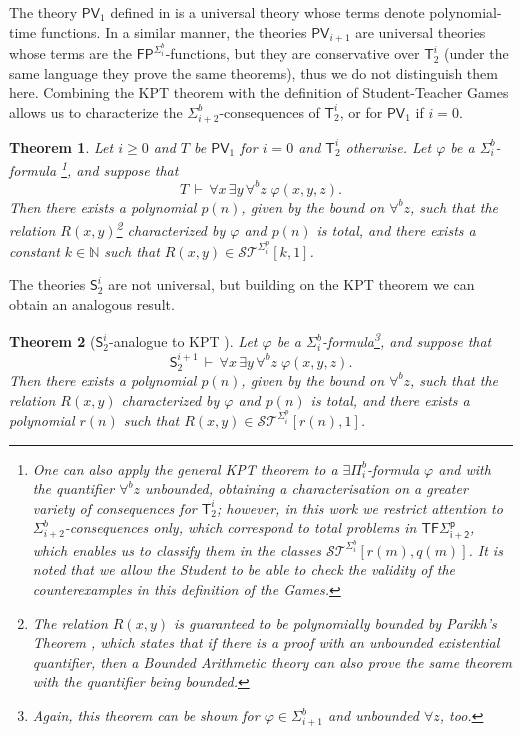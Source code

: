 \documentclass[11pt]{article}
\newcommand{\N}{\mathbb{N}}
\newcommand{\PV}{\mathsf{PV}}
\newcommand{\FP}{\mathsf{FP}}
\newtheorem{theorem}{Theorem}[section]
\theoremstyle{definition}
\theoremstyle{definition}
\theoremstyle{remark}
\begin{document}
The theory $\PV_1$ defined in \cite{KrajicekPT91} is a universal theory whose terms denote polynomial-time functions. In a similar manner, the theories $\PV_{i+1}$ are universal theories whose terms are the $\FP^{\Sigma^b_i}$-functions, but they are conservative over $\mathsf{T}^i_2$ (under the same language they prove the same theorems), thus we do not distinguish them here.
Combining the KPT theorem with the definition of Student-Teacher Games allows us to characterize the $\Sigma^b_{i+2}$-consequences of $\mathsf{T}^i_2$, or for $\PV_1$ if $i=0$.

\begin{theorem}
Let $i\geq0$ and $T$ be $\PV_1$ for $i=0$ and $\mathsf{T}^i_2$ otherwise. Let $\varphi$ be a $\Sigma^b_i$-formula \footnote{One can also apply the general KPT theorem to a $\exists \Pi^b_i$-formula $\varphi$ and with the quantifier $\forall^b z$ unbounded, obtaining a characterisation on a greater variety of consequences for $\mathsf{T}^i_2$; however, in this work we restrict attention to $\Sigma^b_{i+2}$-consequences only, which correspond to total problems in $\mathsf{TF\Sigma^p_{i+2}}$, which enables us to classify them in the classes $\mathcal{ST}^{\Sigma^b_i}[r(m),q(m)]$. It is noted that we allow the Student to be able to check the validity of the counterexamples in this definition of the Games.}, 
and suppose that 
\[
T \,\vdash\, \forall x\, \exists y \, \forall^b z \;\varphi(x,y,z).
\]
Then there exists a polynomial $p(n)$, given by the bound on $\forall^bz$, such that the relation $R(x,y)$\footnote{The relation $R(x,y)$ is guaranteed to be polynomially bounded by Parikh's Theorem \cite{parikh}, which states that if there is a proof with an unbounded existential quantifier, then a Bounded Arithmetic theory can also prove the same theorem with the quantifier being bounded.} characterized by $\varphi$ and $p(n)$ is total, and there exists a constant $k\in\N$ such that $R(x,y)\in \mathcal{ST}^{\Sigma^p_i}[k,1]$.
\end{theorem}


The theories $\mathsf{S}^i_2$ are not universal, but building on the KPT theorem we can obtain an analogous result.

\begin{theorem}[$\mathsf{S}^i_2$-analogue to KPT \cite{krajivcek1992no,Pudlak92}]
Let $\varphi$ be a $\Sigma^b_i$-formula\footnote{Again, this theorem can be shown for $\varphi\in \Sigma^b_{i+1}$ and unbounded $\forall z$, too.}, and suppose that 
\[
\mathsf{S}^{i+1}_2\,\vdash\, \forall x\, \exists y \, \forall^b z \;\varphi(x,y,z).
\]
Then there exists a polynomial $p(n)$, given by the bound on $\forall^bz$, such that the relation $R(x,y)$ characterized by $\varphi$ and $p(n)$ is total, and there exists a polynomial $r(n)$ such that $R(x,y)\in \mathcal{ST}^{\Sigma^p_i}[r(n),1]$.
\end{theorem}
\end{document}

